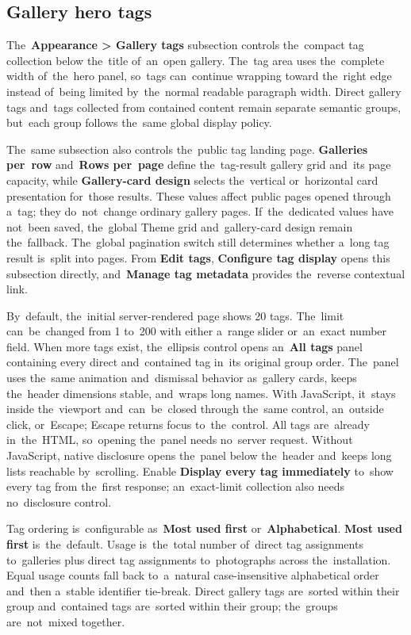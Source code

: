 \documentclass[11pt,a4paper]{article}
\newcommand{\ui}[1]{\textbf{#1}}
\begin{document}
\subsection{Gallery hero tags}

The~\ui{Appearance > Gallery tags} subsection controls the~compact tag
collection below the~title of~an~open gallery. The~tag area uses the~complete
width of~the~hero panel, so~tags can~continue wrapping toward the~right edge
instead of~being limited by~the~normal readable paragraph width. Direct gallery
tags and~tags collected from contained content remain separate semantic groups,
but~each group follows the~same global display policy.

The~same subsection also controls the~public tag landing page. \ui{Galleries
per~row} and~\ui{Rows per~page} define the~tag-result gallery grid and~its page
capacity, while \ui{Gallery-card design} selects the~vertical or~horizontal card
presentation for~those results. These values affect public pages opened through
a~tag; they do~not~change ordinary gallery pages. If~the~dedicated values have
not~been saved, the~global Theme grid and~gallery-card design remain
the~fallback. The~global pagination switch still determines whether a~long tag
result is~split into pages. From \ui{Edit tags}, \ui{Configure tag display}
opens this subsection directly, and~\ui{Manage tag metadata} provides
the~reverse contextual link.

By~default, the~initial server-rendered page shows 20 tags. The~limit
can~be~changed from 1 to~200 with either a~range slider or~an~exact number
field. When more tags exist, the~ellipsis control opens an~\ui{All tags} panel
containing every direct and~contained tag in~its original group order. The~panel
uses the~same animation and~dismissal behavior as~gallery cards, keeps
the~header dimensions stable, and~wraps long names. With JavaScript, it~stays
inside the~viewport and~can~be~closed through the~same control, an~outside
click, or~Escape; Escape returns focus to~the~control. All tags are~already
in~the~HTML, so~opening the~panel needs no~server request. Without JavaScript,
native disclosure opens the~panel below the~header and~keeps long lists
reachable by~scrolling. Enable \ui{Display every tag immediately} to~show every
tag from the~first response; an~exact-limit collection also needs no~disclosure
control.

Tag ordering is~configurable as~\ui{Most used first} or~\ui{Alphabetical}.
\ui{Most used first} is~the~default. Usage is~the~total number of~direct tag
assignments to~galleries plus direct tag assignments to~photographs across
the~installation. Equal usage counts fall back to~a~natural case-insensitive
alphabetical order and~then a~stable identifier tie-break. Direct gallery tags
are~sorted within their group and~contained tags are~sorted within their group;
the~groups are~not~mixed together.
\end{document}
